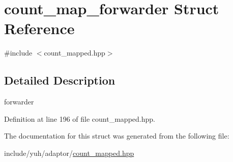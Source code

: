 \hypertarget{structyuh_1_1range__detail_1_1count__map__forwarder}{\section{count\-\_\-map\-\_\-forwarder \-Struct \-Reference}
\label{da/d5c/structyuh_1_1range__detail_1_1count__map__forwarder}
}


{\ttfamily \#include $<$count\-\_\-mapped.\-hpp$>$}



\subsection{\-Detailed \-Description}
forwarder 

\-Definition at line 196 of file count\-\_\-mapped.\-hpp.



\-The documentation for this struct was generated from the following file\-:\begin{DoxyCompactItemize}
\item 
include/yuh/adaptor/\hyperlink{count__mapped_8hpp}{count\-\_\-mapped.\-hpp}\end{DoxyCompactItemize}
